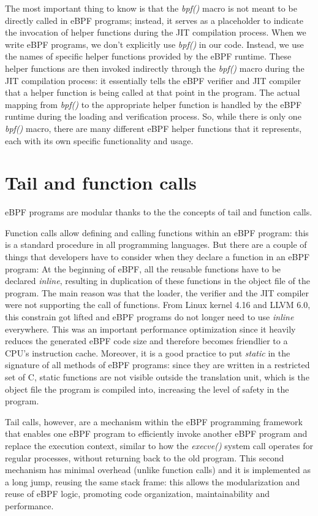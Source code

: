The most important thing to know is that the \textit{bpf()} macro is not meant to be directly called in eBPF programs; instead, it serves as a placeholder to indicate the invocation of helper functions during the JIT compilation process.
When we write eBPF programs, we don't explicitly use \textit{bpf()} in our code. 
Instead, we use the names of specific helper functions provided by the eBPF runtime.
These helper functions are then invoked indirectly through the \textit{bpf()} macro during the JIT compilation process: it essentially tells the eBPF verifier and JIT compiler that a helper function is being called at that point in the program. 
The actual mapping from \textit{bpf()} to the appropriate helper function is handled by the eBPF runtime during the loading and verification process.
So, while there is only one \textit{bpf()} macro, there are many different eBPF helper functions that it represents, each with its own specific functionality and usage.

\section{Tail and function calls}

eBPF programs are modular thanks to the the concepts of tail and function calls.
 
Function calls allow defining and calling functions within an eBPF program: this is a standard procedure in all programming languages. 
But there are a couple of things that developers have to consider when they declare a function in an eBPF program:
At the beginning of eBPF, all the reusable functions have to be declared \textit{inline}, resulting in duplication of these functions in the object file of the program.
The main reason was that the loader, the verifier and the JIT compiler were not supporting the call of functions.
From Linux kernel 4.16 and LLVM 6.0, this constrain got lifted and eBPF programs do not longer need to use \textit{inline} everywhere.
This was an important performance optimization since it heavily reduces the generated eBPF code size and therefore becomes friendlier to a CPU’s instruction cache.
Moreover, it is a good practice to put \textit{static} in the signature of all methods of eBPF programs: since they are written in a restricted set of C, static functions are not	visible outside the translation unit, which is the object file the program is compiled into, increasing the level of safety in the program.

Tail calls, however, are a mechanism within the eBPF programming framework that enables one eBPF program to efficiently invoke another eBPF program and replace the execution context, similar to how the \textit{execve()} system call operates for regular processes, without returning back to the old program.
This second mechanism has minimal overhead (unlike function calls) and it is implemented as a long jump, reusing the same stack frame: this allows the modularization and reuse of eBPF logic, promoting code organization, maintainability and performance.

